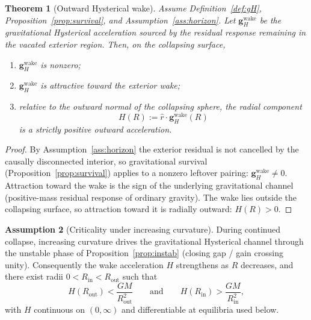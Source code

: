 \documentclass[11pt]{article}
\newtheorem{theorem}{Theorem}[section]
\theoremstyle{definition}
\newtheorem{assumption}[theorem]{Assumption}
\theoremstyle{remark}
\newcommand{\GM}{GM}
\begin{document}
\begin{theorem}[Outward Hysterical wake]
\label{thm:wake}
Assume Definition~\ref{def:gH}, Proposition~\ref{prop:survival}, and
Assumption~\ref{ass:horizon}.
Let $\mathbf g_H^{\mathrm{wake}}$ be the gravitational Hysterical acceleration sourced by
the residual response remaining in the vacated exterior region.
Then, on the collapsing surface,
\begin{enumerate}
\item $\mathbf g_H^{\mathrm{wake}}$ is nonzero;
\item $\mathbf g_H^{\mathrm{wake}}$ is attractive toward the exterior wake;
\item relative to the outward normal of the collapsing sphere, the radial component
\begin{equation}
\label{eq:Hdef}
H(R):=\hat r\cdot\mathbf g_H^{\mathrm{wake}}(R)
\end{equation}
is a strictly positive outward acceleration.
\end{enumerate}
\end{theorem}

\begin{proof}
By Assumption~\ref{ass:horizon} the exterior residual is not cancelled by the
causally disconnected interior, so gravitational survival (Proposition~\ref{prop:survival})
applies to a nonzero leftover pairing: $\mathbf g_H^{\mathrm{wake}}\neq0$.
Attraction toward the wake is the sign of the underlying gravitational channel
(positive-mass residual response of ordinary gravity).
The wake lies outside the collapsing surface, so attraction toward it is radially
outward: $H(R)>0$.
\end{proof}

\begin{assumption}[Criticality under increasing curvature]
\label{ass:crit}
During continued collapse, increasing curvature drives the gravitational Hysterical
channel through the unstable phase of Proposition~\ref{prop:instab} (closing gap /
gain crossing unity).
Consequently the wake acceleration $H$ strengthens as $R$ decreases, and there exist
radii $0<R_{\mathrm{in}}<R_{\mathrm{out}}$ such that
\begin{equation}
\label{eq:sign}
H(R_{\mathrm{out}})<\frac{\GM}{R_{\mathrm{out}}^{2}}
\qquad\text{and}\qquad
H(R_{\mathrm{in}})>\frac{\GM}{R_{\mathrm{in}}^{2}},
\end{equation}
with $H$ continuous on $(0,\infty)$ and differentiable at equilibria used below.
\end{assumption}
\end{document}
